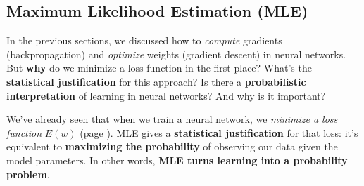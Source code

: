 \subsection{Maximum Likelihood Estimation (MLE)}\label{sec:maximum-likelihood-estimation}

In the previous sections, we discussed how to \emph{compute} gradients (backpropagation) and \emph{optimize} weights (gradient descent) in neural networks. But \textbf{why} do we minimize a loss function in the first place? What's the \textbf{statistical justification} for this approach? Is there a \textbf{probabilistic interpretation} of learning in neural networks? And why is it important?

\highspace
We've already seen that when we train a neural network, we \emph{minimize a loss function} $E(w)$ (page \pageref{eq:optimal-weights}). MLE gives a \textbf{statistical justification} for that loss: it's equivalent to \textbf{maximizing the probability} of observing our data given the model parameters. In other words, \textbf{MLE turns learning into a probability problem}.

